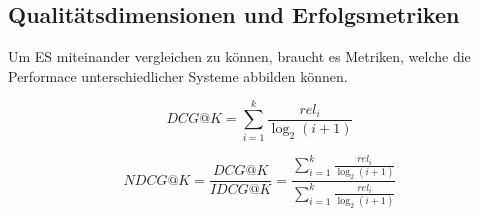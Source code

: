 \subsection{Qualitätsdimensionen und Erfolgsmetriken}
Um \ac{ES} miteinander vergleichen zu können, braucht es Metriken, welche die Performace unterschiedlicher
Systeme abbilden können. 

\begin{equation}
\label{eq:dcg}
DCG@K=\sum_{i=1}^{k}\frac{rel_{i}}{\log_2(i+1)}
\end{equation}

\label{sec:idcg}

\begin{equation}
\label{eq:ndcg}
NDCG@K=\frac{DCG@K}{IDCG@K}=\frac{\sum_{i=1}^{k}\frac{rel_{i}}{\log_2(i+1)}}{\sum_{i=1}^{k}\frac{rel_{i}}{\log_2(i+1)}}
\end{equation}

\Cite{Jarvelin_ndcg_2002} %


